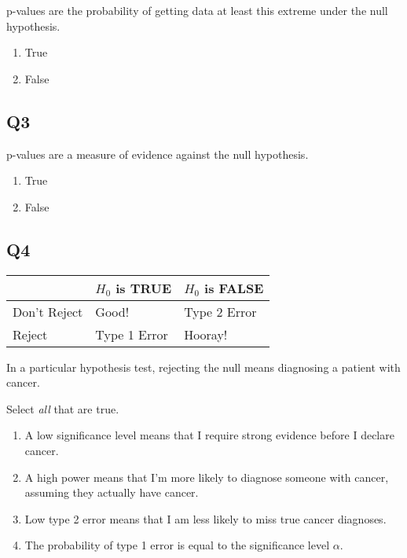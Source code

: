 \documentclass[
  letterpaper,
  DIV=11,
  numbers=noendperiod]{scrreprt}
\providecommand{\tightlist}{%
  \setlength{\itemsep}{0pt}\setlength{\parskip}{0pt}}\usepackage{longtable,booktabs,array}
\def\pspace{}
\begin{document}
p-values are the probability of getting data at least this extreme under
the null hypothesis.

\pspace

\begin{enumerate}
\def\labelenumi{\arabic{enumi}.}
\tightlist
\item
  True
\item
  False
\end{enumerate}

\hypertarget{q3-1}{%
\subsection{Q3}\label{q3-1}}

p-values are a measure of evidence against the null hypothesis.

\pspace

\begin{enumerate}
\def\labelenumi{\arabic{enumi}.}
\tightlist
\item
  True
\item
  False
\end{enumerate}

\hypertarget{q4-1}{%
\subsection{Q4}\label{q4-1}}

\begin{longtable}[]{@{}lll@{}}
\toprule\noalign{}
& \(H_0\) is TRUE & \(H_0\) is FALSE \\
\midrule\noalign{}
\endhead
\bottomrule\noalign{}
\endlastfoot
Don't Reject & Good! & Type 2 Error \\
Reject & Type 1 Error & Hooray! \\
\end{longtable}

In a particular hypothesis test, rejecting the null means diagnosing a
patient with cancer.

Select \emph{all} that are true.

\pspace

\begin{enumerate}
\def\labelenumi{\arabic{enumi}.}
\tightlist
\item
  A low significance level means that I require strong evidence before I
  declare cancer.
\item
  A high power means that I'm more likely to diagnose someone with
  cancer, assuming they actually have cancer.
\item
  Low type 2 error means that I am less likely to miss true cancer
  diagnoses.
\item
  The probability of type 1 error is equal to the significance level
  \(\alpha\).
\end{enumerate}
\end{document}

